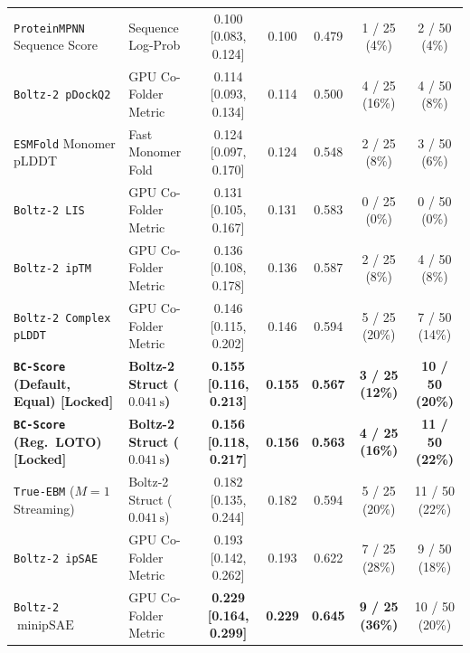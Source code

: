 \documentclass[10pt,twocolumn]{article}
\begin{document}
\begin{table}[p]
{\begin{tabular}{@{}llccccc@{}}
\hspace{0.4em}\texttt{ProteinMPNN} Sequence Score \cite{dauparas2022robust} & Sequence Log-Prob & 0.100 [0.083, 0.124] & 0.100 & 0.479 & 1 / 25 (4\%) & 2 / 50 (4\%) \\
\hspace{0.4em}\texttt{Boltz-2 pDockQ2} \cite{zhu2023pdockq2} & GPU Co-Folder Metric & 0.114 [0.093, 0.134] & 0.114 & 0.500 & 4 / 25 (16\%) & 4 / 50 (8\%) \\
\hspace{0.4em}\texttt{ESMFold} Monomer pLDDT \cite{lin2023evolutionary} & Fast Monomer Fold & 0.124 [0.097, 0.170] & 0.124 & 0.548 & 2 / 25 (8\%) & 3 / 50 (6\%) \\
\hspace{0.4em}\texttt{Boltz-2 LIS} \cite{kim2024lis} & GPU Co-Folder Metric & 0.131 [0.105, 0.167] & 0.131 & 0.583 & 0 / 25 (0\%) & 0 / 50 (0\%) \\
\hspace{0.4em}\texttt{Boltz-2 ipTM} \cite{passaro2025boltz2} & GPU Co-Folder Metric & 0.136 [0.108, 0.178] & 0.136 & 0.587 & 2 / 25 (8\%) & 4 / 50 (8\%) \\
\hspace{0.4em}\texttt{Boltz-2 Complex pLDDT} \cite{passaro2025boltz2} & GPU Co-Folder Metric & 0.146 [0.115, 0.202] & 0.146 & 0.594 & 5 / 25 (20\%) & 7 / 50 (14\%) \\
\hspace{0.4em}\textbf{\texttt{BC-Score} (Default, Equal) [Locked]} & \textbf{Boltz-2 Struct ($0.041\,\text{s}$)} & \textbf{0.155 [0.116, 0.213]} & \textbf{0.155} & \textbf{0.567} & \textbf{3 / 25 (12\%)} & \textbf{10 / 50 (20\%)} \\
\hspace{0.4em}\textbf{\texttt{BC-Score} (Reg.\ LOTO) [Locked]} & \textbf{Boltz-2 Struct ($0.041\,\text{s}$)} & \textbf{0.156 [0.118, 0.217]} & \textbf{0.156} & \textbf{0.563} & \textbf{4 / 25 (16\%)} & \textbf{11 / 50 (22\%)} \\
\hspace{0.4em}\texttt{True-EBM} ($M=1$ Streaming) & Boltz-2 Struct ($0.041\,\text{s}$) & 0.182 [0.135, 0.244] & 0.182 & 0.594 & 5 / 25 (20\%) & 11 / 50 (22\%) \\
\hspace{0.4em}\texttt{Boltz-2 ipSAE} \cite{passaro2025boltz2,dunbrack2025ipsae} & GPU Co-Folder Metric & 0.193 [0.142, 0.262] & 0.193 & 0.622 & 7 / 25 (28\%) & 9 / 50 (18\%) \\
\hspace{0.4em}\texttt{Boltz-2} $\min\text{ipSAE}$ \cite{dunbrack2025ipsae} & GPU Co-Folder Metric & \textbf{0.229 [0.164, 0.299]} & \textbf{0.229} & \textbf{0.645} & \textbf{9 / 25 (36\%)} & 10 / 50 (20\%) \\

\end{tabular}}
\end{table}
\end{document}
